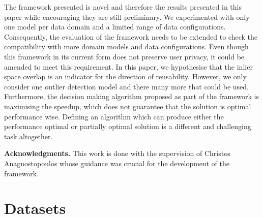 \documentclass{mpaper}
\begin{document}
The framework presented is novel and therefore the results presented in this paper while encouraging they are still preliminary. We experimented with only one model per data domain and a limited range of data configurations. Consequently, the evaluation of the framework needs to be extended to check the compatibility with more domain models and data configurations. Even though this framework in its current form does not preserve user privacy, it could be amended to meet this requirement.
In this paper, we hypothesise that the inlier space overlap is an indicator for the direction of reusability. However, we only consider one outlier detection model and there many more that could be used. Furthermore, the decision making algorithm proposed as part of the framework is maximising the speedup, which does not guarantee that the solution is optimal performance wise. Defining an algorithm which can produce either the performance optimal or partially optimal solution is a different and challenging task altogether.  

\vskip8pt \noindent
{\bf Acknowledgments.}
This work is done with the supervision of Christos Anagnostopoulos whose guidance was crucial for the development of the framework. 




\clearpage



\appendix

\section{Datasets}\label{apx:datasets}

\setcounter{figure}{0} 
\setcounter{table}{0}
\end{document}
